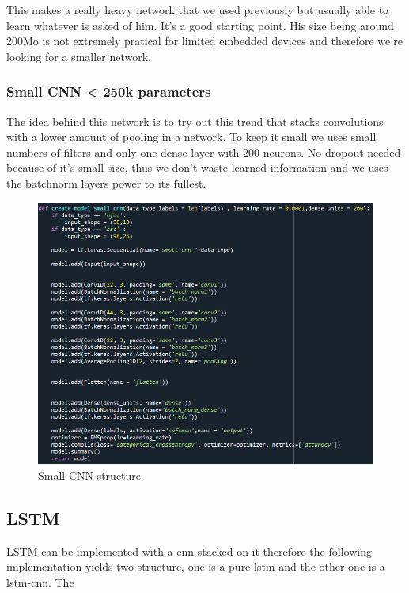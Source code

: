  This makes a really heavy network that we used previously but usually able to learn whatever is asked of him. It's a good starting point. His size being around 200Mo is not extremely pratical for limited embedded devices and therefore we're looking for a smaller network.

\subsubsection{Small CNN < 250k parameters}

The idea behind this network is to try out this trend that stacks convolutions with a lower amount of pooling in a network. To keep it small we uses small numbers of filters and only one dense layer with 200 neurons. No dropout needed because of it's small size, thus we don't waste learned information and we uses the batchnorm layers power to its fullest.

\begin{figure}[h!]
    \centering
    \includegraphics[width=1\textwidth]{chapters/pictures/small_cnn.PNG}
    \caption{Small CNN structure}
    \label{fig:small_cnn}
\end{figure}



\subsection{LSTM}

LSTM can be implemented with a cnn stacked on it therefore the following implementation yields two structure, one is a pure lstm and the other one is a lstm-cnn. The 

